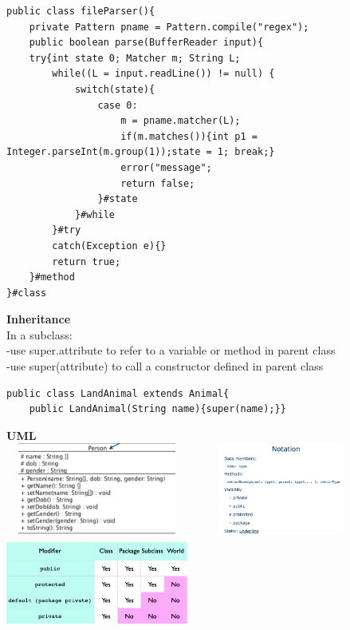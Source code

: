 \documentclass{article}
\begin{document}
\begin{verbatim}
public class fileParser(){
    private Pattern pname = Pattern.compile("regex");
    public boolean parse(BufferReader input){
    try{int state 0; Matcher m; String L;
        while((L = input.readLine()) != null) {
            switch(state){
                case 0:
                    m = pname.matcher(L);
                    if(m.matches()){int p1 = Integer.parseInt(m.group(1));state = 1; break;}
                    error("message";
                    return false;
                }#state
            }#while
        }#try
        catch(Exception e){}
        return true;
    }#method
}#class				
\end{verbatim}
\textbf{Inheritance}\\
In a subclass:\\
-use super.attribute to refer to a variable or method in parent class\\
-use super(attribute) to call a constructor defined in parent class\\
\begin{verbatim}
public class LandAnimal extends Animal{
    public LandAnimal(String name){super(name);}}
\end{verbatim}
\textbf{UML}\\
\includegraphics[width=6cm,height =3cm]{umlexample.png}
\includegraphics[width=6cm,height =3cm]{notation.png}
\includegraphics[width=6cm,height =3cm]{table.png}\\
\end{document}
